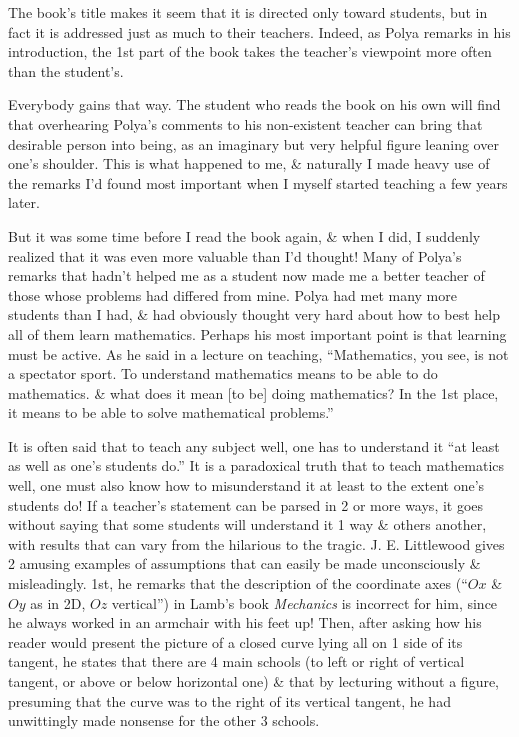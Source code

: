 \documentclass{article}
\begin{document}
\begin{enumerate}
\begin{itemize}
		The book's title makes it seem that it is directed only toward students, but in fact it is addressed just as much to their teachers. Indeed, as {\sc Polya} remarks in his introduction, the 1st part of the book takes the teacher's viewpoint more often than the student's.
		
		Everybody gains that way. The student who reads the book on his own will find that overhearing {\sc Polya}'s comments to his non-existent teacher can bring that desirable person into being, as an imaginary but very helpful figure leaning over one's shoulder. This is what happened to me, \& naturally I made heavy use of the remarks I'd found most important when I myself started teaching a few years later.
		
		But it was some time before I read the book again, \& when I did, I suddenly realized that it was even more valuable than I'd thought! Many of {\sc Polya}'s remarks that hadn't helped me as a student now made me a better teacher of those whose problems had differed from mine. {\sc Polya} had met many more students than I had, \& had obviously thought very hard about how to best help all of them learn mathematics. Perhaps his most important point is that learning must be active. As he said in a lecture on teaching, ``Mathematics, you see, is not a spectator sport. To understand mathematics means to be able to do mathematics. \& what does it mean [to be] doing mathematics? In the 1st place, it means to be able to solve mathematical problems.''
		
		It is often said that to teach any subject well, one has to understand it ``at least as well as one's students do.'' It is a paradoxical truth that to teach mathematics well, one must also know how to misunderstand it at least to the extent one's students do! If a teacher's statement can be parsed in 2 or more ways, it goes without saying that some students will understand it 1 way \& others another, with results that can vary from the hilarious to the tragic. {\sc J. E. Littlewood} gives 2 amusing examples of assumptions that can easily be made unconsciously \& misleadingly. 1st, he remarks that the description of the coordinate axes (``$Ox$ \& $Oy$ as in 2D, $Oz$ vertical'') in {\sc Lamb}'s book {\it Mechanics} is incorrect for him, since he always worked in an armchair with his feet up! Then, after asking how his reader would present the picture of a closed curve lying all on 1 side of its tangent, he states that there are 4 main schools (to left or right of vertical tangent, or above or below horizontal one) \& that by lecturing without a figure, presuming that the curve was to the right of its vertical tangent, he had unwittingly made nonsense for the other 3 schools.
		

\end{itemize}
\end{enumerate}
\end{document}
